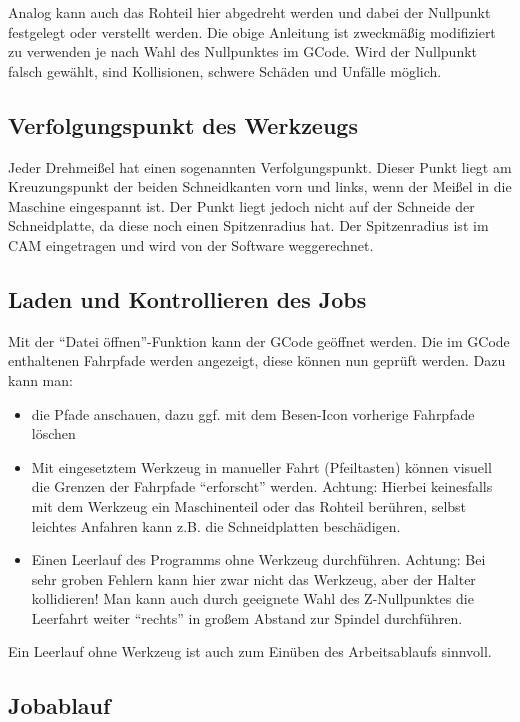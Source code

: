 \documentclass{\basedir/fablab-document}
\begin{document}
Analog kann auch das Rohteil hier abgedreht werden und dabei der Nullpunkt festgelegt oder verstellt werden. Die obige Anleitung ist zweckmäßig modifiziert zu verwenden je nach Wahl des Nullpunktes im GCode. Wird der Nullpunkt falsch gewählt, sind Kollisionen, schwere Schäden und Unfälle möglich.

\subsection{Verfolgungspunkt des Werkzeugs}
Jeder Drehmeißel hat einen sogenannten Verfolgungspunkt. Dieser Punkt liegt am Kreuzungspunkt der beiden Schneidkanten vorn und links, wenn der Meißel in die Maschine eingespannt ist. Der Punkt liegt jedoch nicht auf der Schneide der Schneidplatte, da diese noch einen Spitzenradius hat. Der Spitzenradius ist im CAM eingetragen und wird von der Software weggerechnet.

\subsection{Laden und Kontrollieren des Jobs}

Mit der \enquote{Datei öffnen}-Funktion kann der GCode geöffnet werden. Die im GCode enthaltenen Fahrpfade werden angezeigt, diese können nun geprüft werden. Dazu kann man:
\begin{itemize}
	\item die Pfade anschauen, dazu ggf. mit dem Besen-Icon vorherige Fahrpfade löschen
	\item Mit eingesetztem Werkzeug in manueller Fahrt (Pfeiltasten) können visuell die Grenzen der Fahrpfade \enquote{erforscht} werden. Achtung: Hierbei keinesfalls mit dem Werkzeug ein Maschinenteil oder das Rohteil berühren, selbst leichtes Anfahren kann z.B. die Schneidplatten beschädigen.
	\item Einen Leerlauf des Programms ohne Werkzeug durchführen. Achtung: Bei sehr groben Fehlern kann hier zwar nicht das Werkzeug, aber der Halter kollidieren! Man kann auch durch geeignete Wahl des Z-Nullpunktes die Leerfahrt weiter \enquote{rechts} in großem Abstand zur Spindel durchführen.
\end{itemize}

Ein Leerlauf ohne Werkzeug ist auch zum Einüben des Arbeitsablaufs sinnvoll.

\subsection{Jobablauf}
\end{document}

